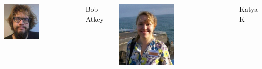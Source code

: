 \documentclass[t,compress,aspectratio=169]{beamer}
\begin{document}
\begin{frame}
\begin{columns}
  \vspace{-2em}
   \centering
     \includegraphics[width=0.5\textwidth]{img/Bob.jpeg}
           \vspace{1em}
          \begin{block}{\centering\footnotesize{Bob Atkey}}
     \end{block}

\includegraphics[width=0.5\textwidth]{img/Katya3.jpg}
\vspace{-1em}
\begin{block}{\centering\footnotesize{Katya K}}
   \end{block}


\end{columns}
\end{frame}
\end{document}
